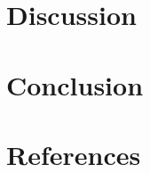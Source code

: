 \documentclass[letterpaper,10pt,english]{jupyterBook}
\begin{document}
\chapter{Discussion}
\label{\detokenize{content/chapter_07_discussion/main:discussion}}\label{\detokenize{content/chapter_07_discussion/main::doc}}

\chapter{Conclusion}
\label{\detokenize{content/chapter_08_conclusion/main:conclusion}}\label{\detokenize{content/chapter_08_conclusion/main::doc}}

\chapter{References}
\label{\detokenize{references:references}}\label{\detokenize{references::doc}}
\sphinxAtStartPar
\end{document}
